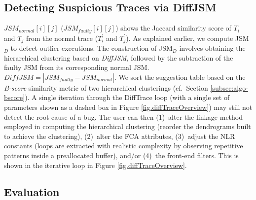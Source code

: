 \subsection{Detecting Suspicious Traces via DiffJSM}
$JSM_{normal}[i][j]$ ($JSM_{faulty}[i][j]$) shows the Jaccard similarity score of $T_i$ and $T_j$ from the normal trace ($T_i^\prime$ and $T_j^\prime$).
% 
%
As explained earlier, we compute
JSM$_{D}$ to detect outlier executions.
%
The construction
of JSM$_{D}$ 
involves obtaining the hierarchical clustering based on \textit{DiffJSM},
followed by the subtraction of the faulty JSM from its corresponding normal JSM.
$DiffJSM = |JSM_{faulty} - JSM_{normal}|$.
%
We sort the suggestion table based on the \textit{B-score}
similarity metric of two hierarchical clusterings \cite{fowlkes83} (cf.~Section \ref{subsec:algo-bscore}).
%
A single iteration through the
DiffTrace loop
(with a single set of parameters shown as a dashed box in Figure \ref{fig.diffTraceOverview})
may still not detect the root-cause of a bug.
%
The user can then (1)~alter the linkage method employed in computing the hierarchical clustering
(reorder the dendrograms built to achieve the clustering),
(2)~alter the FCA attributes, (3)~adjust the NLR constants (loops are extracted with
realistic complexity by observing repetitive patterns inside a preallocated buffer),
and/or (4)~the front-end filters.
%
This is shown in the iterative loop in
Figure \ref{fig.diffTraceOverview}.

\subsection{Evaluation}

%

%
%


